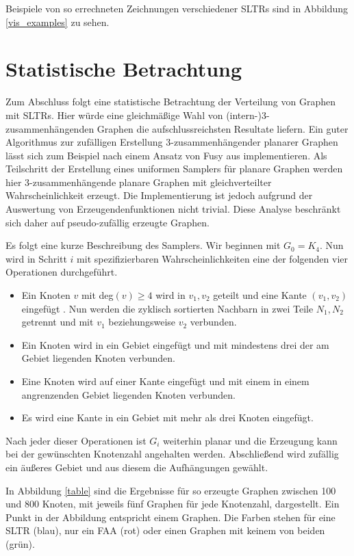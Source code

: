 Beispiele von so errechneten Zeichnungen verschiedener SLTRs sind in Abbildung \ref{vis_examples} zu sehen.

\section{Statistische Betrachtung}

Zum Abschluss folgt eine statistische Betrachtung der Verteilung von Graphen mit SLTRs. Hier würde eine gleichmäßige Wahl von (intern-)3-zusammenhängenden Graphen die aufschlussreichsten Resultate liefern. Ein guter Algorithmus zur zufälligen Erstellung 3-zusammenhängender planarer Graphen lässt sich zum Beispiel nach einem Ansatz von Fusy aus \cite{fusy09} implementieren. Als Teilschritt der Erstellung eines uniformen Samplers für planare Graphen werden hier 3-zusammenhängende planare Graphen mit gleichverteilter Wahrscheinlichkeit erzeugt. Die Implementierung ist jedoch aufgrund der Auswertung von Erzeugendenfunktionen nicht trivial. Diese Analyse beschränkt sich daher auf pseudo-zufällig erzeugte Graphen. 

Es folgt eine kurze Beschreibung des Samplers. Wir beginnen mit $G_0 = K_4$. Nun wird in Schritt $i$ mit spezifizierbaren Wahrscheinlichkeiten eine der folgenden vier Operationen durchgeführt.

\begin{itemize}
\item Ein Knoten $v$ mit deg$(v) \geq 4$ wird in $v_1,v_2$ geteilt und eine Kante $(v_1,v_2)$ eingefügt . Nun werden die zyklisch sortierten Nachbarn in zwei Teile $N_1,N_2$ getrennt und mit $v_1$ beziehungsweise $v_2$ verbunden.
\item Ein Knoten wird in ein Gebiet eingefügt und mit mindestens drei der am Gebiet liegenden Knoten verbunden. 
\item Eine Knoten wird auf einer Kante eingefügt und mit einem in einem angrenzenden Gebiet liegenden Knoten verbunden.
\item Es wird eine Kante in ein Gebiet mit mehr als drei Knoten eingefügt.
\end{itemize}

Nach jeder dieser Operationen ist $G_i$ weiterhin planar und die Erzeugung kann bei der gewünschten Knotenzahl angehalten werden. Abschließend wird zufällig ein äußeres Gebiet und aus diesem die Aufhängungen gewählt.

In Abbildung \ref{table} sind die Ergebnisse für so erzeugte Graphen zwischen 100 und 800 Knoten, mit jeweils fünf Graphen für jede Knotenzahl, dargestellt. Ein Punkt in der Abbildung entspricht einem Graphen. Die Farben stehen für eine SLTR (blau), nur ein FAA (rot) oder einen Graphen mit keinem von beiden (grün). \\



